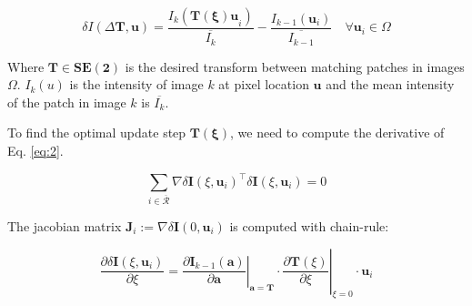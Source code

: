  



\begin{equation}
\delta I(\Delta \mathbf{T}, \mathbf{u})=\frac{I_{k}\left(\mathbf{ T(\xi) u}_i\right)}{\overline{I_{k}}}-\frac{I_{k-1}\left(\mathbf{u}_i\right)}{\overline{I_{k-1}}} \quad \forall \mathbf{u}_i \in \Omega
\end{equation}

Where $\bm {T \in SE(2)}$ is the desired transform between matching patches in images $\Omega$. $I_k(u)$ is the intensity of image  $k$ at pixel location $\mathbf{u}$ and the mean intensity of the patch in image $k$
is ${\overline{I_k}}$.

To find the optimal update step $\bm { \mathbf{T}({\xi})}$, we need to compute the derivative of Eq. \ref{eq:2}.  

\begin{equation}
\sum_{i \in \overline{\mathcal{R}}} \nabla \delta \mathbf{I}\left(\xi, \mathbf{u}_i\right)^{\top} \delta \mathbf{I}\left(\xi, \mathbf{u}_i\right)=0    
\end{equation}

The jacobian matrix $\mathbf{J}_i:=\nabla \delta \mathbf{I}\left(0, \mathbf{u}_i\right)$ is computed with chain-rule:


\begin{equation}
\frac{\partial \delta \mathbf{I}\left(\xi, \mathbf{u}_i\right)}{\partial \xi}=\left.\left.\frac{\partial \mathbf{I}_{k-1}(\mathbf{a})}{\partial \mathbf{a}}\right|_{\mathbf{a}=\mathbf{T}}  \cdot \frac{\partial \mathbf{T}(\xi)}{\partial \xi}\right|_{\xi=0} \cdot \mathbf{u}_i    
\end{equation}







